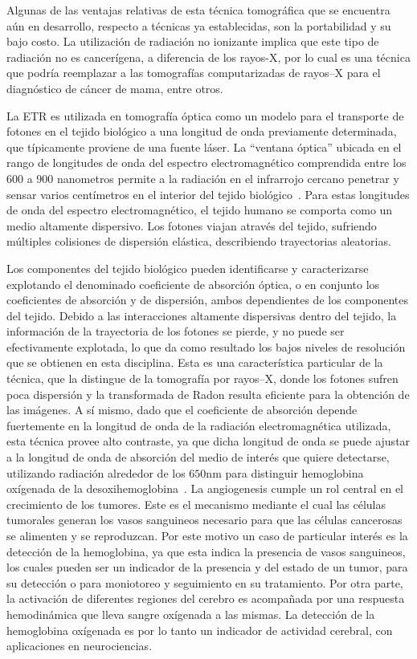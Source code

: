  Algunas de las ventajas relativas de esta técnica tomográfica que se encuentra aún en desarrollo, respecto a 
 técnicas ya establecidas, son la portabilidad y su bajo costo. 
 La utilización de radiación no 
 ionizante implica que este tipo de radiación no es cancerígena, a diferencia de los rayos-X, 
 por lo cual es una técnica que podría reemplazar a las tomografías 
 computarizadas de rayos--X para el diagnóstico de cáncer de mama, entre otros. 
 
 La ETR es utilizada 
 en tomografía óptica como
 un modelo para el transporte de fotones en el tejido biológico a una longitud de onda previamente determinada, 
 que típicamente proviene de una fuente láser.
 La ``ventana óptica'' ubicada en el rango de longitudes de onda del espectro electromagnético comprendida entre los 600 a 900 nanometros permite a la radiación en el 
 infrarrojo cercano penetrar y sensar varios centímetros en el interior del tejido biológico~\cite{Boas2001}. 
 Para estas longitudes de onda del espectro electromagnético, el tejido humano se comporta 
 como un medio altamente dispersivo. Los fotones viajan através del
 tejido, sufriendo múltiples colisiones de dispersión elástica, describiendo trayectorias 
aleatorias.

 Los componentes del tejido biológico pueden identificarse y caracterizarse
 explotando el denominado coeficiente de absorción óptica, o en conjunto 
 los coeficientes de absorción y de dispersión, ambos dependientes 
 de los componentes del tejido.
 Debido a las interacciones altamente dispersivas dentro del tejido,
 la información de la trayectoria de los fotones se pierde, y no puede ser efectivamente explotada,
 lo que da como resultado los bajos niveles de resolución que se obtienen en esta disciplina. 
 Esta es una característica particular de la técnica, que la distingue de la tomografía 
 por rayos--X, donde los fotones sufren poca dispersión y la transformada de 
Radon resulta eficiente para la obtención de las imágenes. A sí mismo, 
 dado que el coeficiente de absorción depende fuertemente en la longitud de onda 
 de la radiación electromagnética utilizada, esta técnica provee alto contraste, 
 ya que dicha longitud de onda se puede ajustar a la longitud de onda de absorción 
 del medio de interés que quiere detectarse, \eg utilizando radiación alrededor de los $650$nm 
 para distinguir hemoglobina oxígenada de la desoxihemoglobina~\cite{Boas2001}. La angiogenesis 
 cumple un rol central en el crecimiento de los tumores. Este es 
 el mecanismo mediante el cual las células tumorales generan los vasos sanguineos 
 necesario para que las células cancerosas se alimenten y se reproduzcan. Por este 
 motivo un caso de particular interés es la detección de la hemoglobina, ya que esta indica la presencia de vasos sanguineos, los cuales pueden ser un indicador de la presencia y del estado de un tumor, para su detección o para moniotoreo y seguimiento en su tratamiento. 
 Por otra parte, 
 la activación de diferentes regiones del cerebro 
 es acompañada por una respuesta hemodinámica que lleva sangre oxígenada 
 a las mismas. La detección de la hemoglobina 
 oxígenada es por lo tanto un indicador de actividad cerebral, con aplicaciones 
 en neurociencias. 
 
